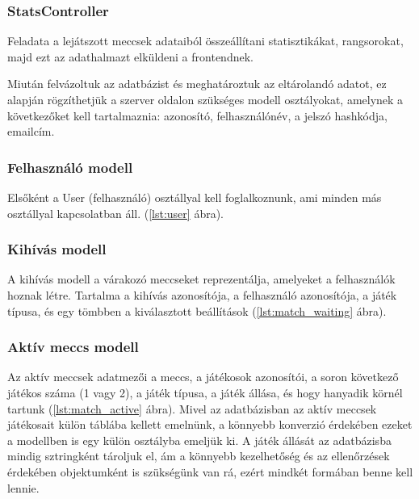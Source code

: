 \subsubsection{StatsController}
Feladata a lejátszott meccsek adataiból összeállítani statisztikákat, rangsorokat, majd ezt az adathalmazt elküldeni a frontendnek.




Miután felvázoltuk az adatbázist és meghatároztuk az eltárolandó adatot, ez alapján rögzíthetjük a szerver oldalon szükséges modell osztályokat, amelynek a következőket kell tartalmaznia: azonosító, felhasználónév, a jelszó hashkódja, emailcím.


\subsubsection{Felhasználó modell}
Elsőként a User (felhasználó) osztállyal kell foglalkoznunk, ami minden más osztállyal kapcsolatban áll. (\ref{lst:user} ábra).



\subsubsection{Kihívás modell}
A kihívás modell a várakozó meccseket reprezentálja, amelyeket a felhasználók hoznak létre. Tartalma a kihívás azonosítója, a felhasználó azonosítója, a játék típusa, és egy tömbben a kiválasztott beállítások (\ref{lst:match_waiting} ábra).



\subsubsection{Aktív meccs modell}
Az aktív meccsek adatmezői a meccs, a játékosok azonosítói, a soron következő játékos száma (1 vagy 2), a játék típusa, a játék állása, és hogy hanyadik körnél tartunk (\ref{lst:match_active} ábra). Mivel az adatbázisban az aktív meccsek játékosait külön táblába kellett emelnünk, a könnyebb konverzió érdekében ezeket a modellben is egy külön osztályba emeljük ki. A játék állását az adatbázisba mindig sztringként tároljuk el, ám a könnyebb kezelhetőség és az ellenőrzések érdekében objektumként is szükségünk van rá, ezért mindkét formában benne kell lennie.

